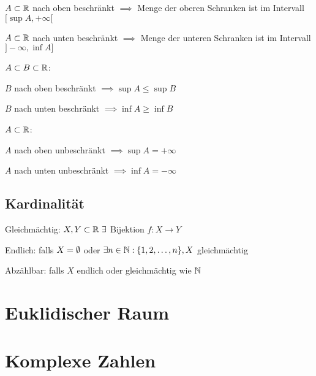 \begin{compactenum}
    \item $A \subset \mathbb{R}$ nach oben beschränkt $\implies$ Menge der oberen Schranken ist  im Intervall $[\sup A, +\infty[$
    \item $A \subset \mathbb{R}$ nach unten beschränkt $\implies$ Menge der unteren Schranken ist  im Intervall $]-\infty, \inf A]$
\end{compactenum}

$A \subset  B \subset  \mathbb{R}$:
\begin{compactenum}
    \item $B$ nach oben beschränkt $\implies \sup A \le \sup B$
    \item $B$ nach unten beschränkt $\implies \inf A \ge \inf B$
\end{compactenum}

$A \subset \mathbb{R}$:
\begin{compactenum}
    \item $A$ nach oben unbeschränkt $\implies \sup A = +\infty$
    \item $A$ nach unten unbeschränkt $\implies \inf A = -\infty$
\end{compactenum}

\subsection{Kardinalität}
\begin{compactdesc}
    \item[Gleichmächtig:] $X,Y \subset \mathbb{R} \ \exists$ Bijektion $f : X \to Y$
    \item[Endlich:] falls $X = \emptyset$ oder $\exists n \in \mathbb{N}: \{1, 2, \ldots, n\}, X$ gleichmächtig
    \item[Abzählbar:] falls $X$ endlich oder gleichmächtig wie $\mathbb{N}$
\end{compactdesc}

\section{Euklidischer Raum}
\section{Komplexe Zahlen}
